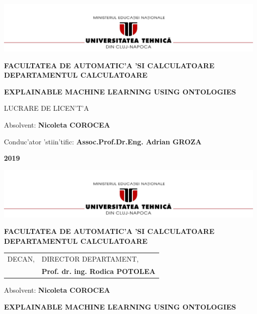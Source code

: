 \documentclass[12pt,a4paper,twoside]{report}
\renewcommand{\thesisauthor}{Nicoleta COROCEA}    %
\renewcommand{\thesisyear}{2019}      %
\renewcommand{\thesistitle}{EXPLAINABLE MACHINE LEARNING USING ONTOLOGIES } %
\renewcommand{\thesissupervisor}{Assoc.Prof.Dr.Eng. Adrian GROZA}
\newcommand{\department}{FACULTATEA DE AUTOMATIC'A 'SI CALCULATOARE\\
DEPARTAMENTUL CALCULATOARE}
\newcommand{\thesis}{LUCRARE DE LICEN'T'A}
\newcommand{\utcnlogo}{\includegraphics[width=15cm]{img/utcn.jpg}}
\begin{document}

\newenvironment{definition}[1][Defini'tie.]{\begin{trivlist}
\item[\hskip \labelsep {\bfseries #1}]}{\end{trivlist}}





\begin{center}
\utcnlogo

{\bf \department}

\vspace{4cm}

{\bf \thesistitle} %

\vspace{1.5cm}

\thesis

\vspace{6cm}

Absolvent: {\bf \thesisauthor} 

Conduc'ator 'stiin'tific: {\bf \thesissupervisor}

\vspace{3cm}
{\bf \thesisyear}
\end{center}

\thispagestyle{empty}
\newpage

\begin{center}
\utcnlogo

{\bf \department}
\end{center}
\vspace{0.5cm}

\begin{tabular}{p{7cm}p{8cm}}
 \hspace{-1cm}DECAN, & DIRECTOR DEPARTAMENT,\\
\hspace{-1cm}{\bf Prof. dr. ing. Liviu MICLEA} & {\bf Prof. dr. ing. Rodica POTOLEA}\\  
\end{tabular}
 
\vspace{2cm}

\begin{center}
Absolvent: {\bf \thesisauthor}

\vspace{1cm}

{\bf \thesistitle}
\end{center}
\end{document}

